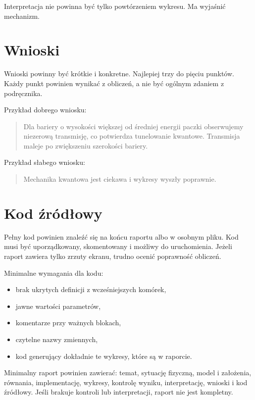 Interpretacja nie powinna być tylko powtórzeniem wykresu. Ma wyjaśnić mechanizm.

\section{Wnioski}

Wnioski powinny być krótkie i konkretne. Najlepiej trzy do pięciu punktów. Każdy punkt powinien wynikać z obliczeń, a nie być ogólnym zdaniem z podręcznika.

Przykład dobrego wniosku:
\begin{quote}
    Dla bariery o wysokości większej od średniej energii paczki obserwujemy niezerową transmisję, co potwierdza tunelowanie kwantowe. Transmisja maleje po zwiększeniu szerokości bariery.
\end{quote}

Przykład słabego wniosku:
\begin{quote}
    Mechanika kwantowa jest ciekawa i wykresy wyszły poprawnie.
\end{quote}

\section{Kod źródłowy}

Pełny kod powinien znaleźć się na końcu raportu albo w osobnym pliku. Kod musi być uporządkowany, skomentowany i możliwy do uruchomienia. Jeżeli raport zawiera tylko zrzuty ekranu, trudno ocenić poprawność obliczeń.

Minimalne wymagania dla kodu:
\begin{itemize}
    \item brak ukrytych definicji z wcześniejszych komórek,
    \item jawne wartości parametrów,
    \item komentarze przy ważnych blokach,
    \item czytelne nazwy zmiennych,
    \item kod generujący dokładnie te wykresy, które są w raporcie.
\end{itemize}

\begin{summarybox}
Minimalny raport powinien zawierać: temat, sytuację fizyczną, model i założenia, równania, implementację, wykresy, kontrolę wyniku, interpretację, wnioski i kod źródłowy. Jeśli brakuje kontroli lub interpretacji, raport nie jest kompletny.
\end{summarybox}
